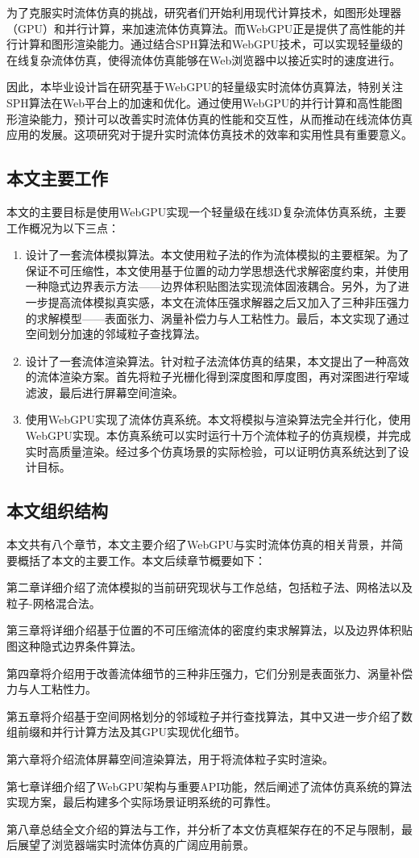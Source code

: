     为了克服实时流体仿真的挑战，研究者们开始利用现代计算技术，如图形处理器（GPU）和并行计算，来加速流体仿真算法。而WebGPU正是提供了高性能的并行计算和图形渲染能力。通过结合SPH算法和WebGPU技术，可以实现轻量级的在线复杂流体仿真，使得流体仿真能够在Web浏览器中以接近实时的速度进行。
    
    因此，本毕业设计旨在研究基于WebGPU的轻量级实时流体仿真算法，特别关注SPH算法在Web平台上的加速和优化。通过使用WebGPU的并行计算和高性能图形渲染能力，预计可以改善实时流体仿真的性能和交互性，从而推动在线流体仿真应用的发展。这项研究对于提升实时流体仿真技术的效率和实用性具有重要意义。

\subsection{本文主要工作}
    本文的主要目标是使用WebGPU实现一个轻量级在线3D复杂流体仿真系统，主要工作概况为以下三点：

    \begin{enumerate}
    	\item 设计了一套流体模拟算法。本文使用粒子法的作为流体模拟的主要框架。为了保证不可压缩性，本文使用基于位置的动力学思想迭代求解密度约束，并使用一种隐式边界表示方法——边界体积贴图法实现流体固液耦合。另外，为了进一步提高流体模拟真实感，本文在流体压强求解器之后又加入了三种非压强力的求解模型——表面张力、涡量补偿力与人工粘性力。最后，本文实现了通过空间划分加速的邻域粒子查找算法。
    	\item 设计了一套流体渲染算法。针对粒子法流体仿真的结果，本文提出了一种高效的流体渲染方案。首先将粒子光栅化得到深度图和厚度图，再对深图进行窄域滤波，最后进行屏幕空间渲染。
    	\item 使用WebGPU实现了流体仿真系统。本文将模拟与渲染算法完全并行化，使用WebGPU实现。本仿真系统可以实时运行十万个流体粒子的仿真规模，并完成实时高质量渲染。经过多个仿真场景的实际检验，可以证明仿真系统达到了设计目标。
    \end{enumerate}

\subsection{本文组织结构}
    本文共有八个章节，本文主要介绍了WebGPU与实时流体仿真的相关背景，并简要概括了本文的主要工作。本文后续章节概要如下：
    
    第二章详细介绍了流体模拟的当前研究现状与工作总结，包括粒子法、网格法以及粒子-网格混合法。
    
    第三章将详细介绍基于位置的不可压缩流体的密度约束求解算法，以及边界体积贴图这种隐式边界条件算法。
    
    第四章将介绍用于改善流体细节的三种非压强力，它们分别是表面张力、涡量补偿力与人工粘性力。
    
    第五章将介绍基于空间网格划分的邻域粒子并行查找算法，其中又进一步介绍了数组前缀和并行计算方法及其GPU实现优化细节。
    
    第六章将介绍流体屏幕空间渲染算法，用于将流体粒子实时渲染。
    
    第七章详细介绍了WebGPU架构与重要API功能，然后阐述了流体仿真系统的算法实现方案，最后构建多个实际场景证明系统的可靠性。
    
    第八章总结全文介绍的算法与工作，并分析了本文仿真框架存在的不足与限制，最后展望了浏览器端实时流体仿真的广阔应用前景。